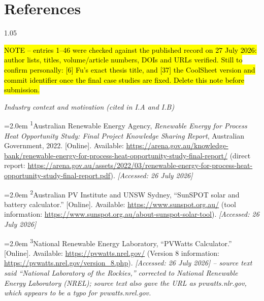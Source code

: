 \documentclass[12pt,letterpaper]{article}
\newcommand{\placeholder}[1]{\hl{#1}}
\DeclareRobustCommand{\refanchor}[1]{\hypertarget{ref:#1}{#1}} %
\newcommand{\referenceheading}[1]{\vspace{1.55em}\textit{#1}\par\vspace{0.45em}}
\newcommand{\refentry}[1]{\hangindent=2.0em\hangafter=1 #1\par\vspace{0.2em}}
\begin{document}
\section*{References}\label{sec50}
{}

\begin{spacing}{1.05}
\footnotesize

\placeholder{NOTE -- entries 1--46 were checked against the published record on 27 July 2026: author lists, titles, volume/article numbers, DOIs and URLs verified. Still to confirm personally: [6] Fu's exact thesis title, and [37] the CoolSheet version and commit identifier once the final case studies are fixed. Delete this note before submission.}

\referenceheading{Industry context and motivation (cited in I.A and I.B)}

\refentry{
\textsuperscript{\refanchor{1}}Australian Renewable Energy Agency, \textit{Renewable Energy for Process Heat Opportunity Study: Final Project Knowledge Sharing Report}, Australian Government, 2022. [Online]. Available: \url{https://arena.gov.au/knowledge-bank/renewable-energy-for-process-heat-opportunity-study-final-report/} (direct report: \url{https://arena.gov.au/assets/2022/03/renewable-energy-for-process-heat-opportunity-study-final-report.pdf}). \textit{[Accessed: 26 July 2026]}
}

\refentry{
\textsuperscript{\refanchor{2}}Australian PV Institute and UNSW Sydney, ``SunSPOT solar and battery calculator.'' [Online]. Available: \url{https://www.sunspot.org.au/} (tool information: \url{https://www.sunspot.org.au/about-sunspot-solar-tool}). \textit{[Accessed: 26 July 2026]}
}

\refentry{
\textsuperscript{\refanchor{3}}National Renewable Energy Laboratory, ``PVWatts Calculator.'' [Online]. Available: \url{https://pvwatts.nrel.gov/} (Version 8 information: \url{https://pvwatts.nrel.gov/version_8.php}). \textit{[Accessed: 26 July 2026] -- source text said ``National Laboratory of the Rockies,'' corrected to National Renewable Energy Laboratory (NREL); source text also gave the URL as pvwatts.nlr.gov, which appears to be a typo for pvwatts.nrel.gov.}
}


\end{spacing}
\end{document}
